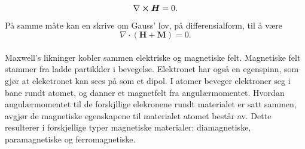 \documentclass[%
 reprint,
 amsmath,amssymb,
 aps,
]{revtex4-1}
\begin{document}
\begin{equation}
  \nabla \cross \bm{H} = 0.
\end{equation}På samme måte kan en skrive om Gauss' lov, på differensialform, til å være
\begin{equation}
  \nabla \cdot \left(\bm{H}+\bm{M}\right) = 0.
\end{equation}
\\
Maxwell's likninger kobler sammen elektriske og magnetiske felt. Magnetiske felt stammer fra ladde partikkler i bevegelse. Elektronet har også en egenspinn, som gjør at eleketronet kan sees på som et dipol. I atomer beveger elektroner seg i bane rundt atomet, og danner et magnetfelt fra angulærmomentet. Hvordan angulærmomentet til de forskjllige elekronene rundt materialet er satt sammen, avgjør de magnetiske egenskapene til materialet atomet består av. Dette resulterer i forskjellige typer magnetiske materialer: diamagnetiske, paramagnetiske og ferromagnetiske.
\end{document}
